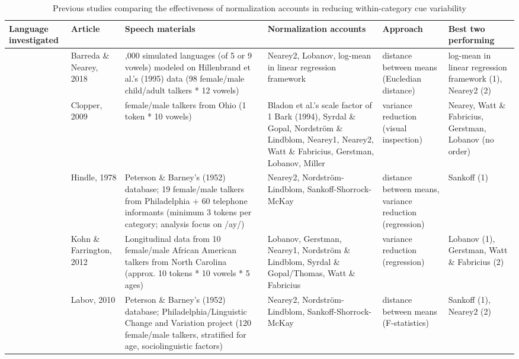\documentclass[utf8]{frontiersSCNS}
\begin{document}
\begin{landscape}\begin{table}

\caption{\label{tab:norm-evaluation-variability}Previous studies comparing the effectiveness of normalization accounts in reducing within-category cue variability}
\centering
\fontsize{7}{9}\selectfont
\begin{tabular}[t]{>{\raggedright\arraybackslash}p{2cm}>{\raggedright\arraybackslash}p{2cm}>{\raggedright\arraybackslash}p{5.5cm}>{\raggedright\arraybackslash}p{6cm}>{\raggedright\arraybackslash}p{2.5cm}>{\raggedright\arraybackslash}p{2.5cm}}
\toprule
Language investigated & Article & Speech materials & Normalization accounts & Approach & Best two performing\\
\midrule
 & Barreda \& Nearey, 2018 & 120,000 simulated languages (of 5 or 9 vowels) modeled on Hillenbrand et al.'s (1995) data (98 female/male child/adult talkers * 12 vowels) & Nearey2, Lobanov, log-mean in linear regression framework & distance between means (Eucledian distance) & log-mean in linear regression framework (1), Nearey2 (2)\\
\cmidrule{2-6}
 & Clopper, 2009 & 2 female/male talkers from Ohio (1 token * 10 vowels) & Bladon et al.'s scale factor of 1 Bark (1994), Syrdal \& Gopal, Nordström \& Lindblom, Nearey1, Nearey2, Watt \& Fabricius, Gerstman, Lobanov, Miller & variance reduction (visual inspection) & Nearey, Watt \& Fabricius, Gerstman, Lobanov (no order)\\
\cmidrule{2-6}
 & Hindle, 1978 & Peterson \& Barney's (1952) database; 19 female/male talkers from Philadelphia + 60 telephone informants (minimum 3 tokens per category; analysis focus on /ay/) & Nearey2, Nordström-Lindblom, Sankoff-Shorrock-McKay & distance between means, variance reduction (regression) & Sankoff (1)\\
\cmidrule{2-6}
 & Kohn \& Farrington, 2012 & Longitudinal data from 10 female/male African American talkers from North Carolina (approx. 10 tokens * 10 vowels * 5 ages) & Lobanov, Gerstman, Nearey1, Nordström \& Lindblom, Syrdal \& Gopal/Thomas, Watt \& Fabricius & variance reduction (regression) & Lobanov (1), Gerstman, Watt \& Fabricius (2)\\
\cmidrule{2-6}
\multirow{-5}{2cm}{\raggedright\arraybackslash US English} & Labov, 2010 & Peterson \& Barney's (1952) database; Philadelphia/Linguistic Change and Variation project (120 female/male talkers, stratified for age, sociolinguistic factors) & Nearey2, Nordström-Lindblom, Sankoff-Shorrock-McKay & distance between means (F-statistics) & Sankoff (1), Nearey2 (2)\\

\end{tabular}
\end{table}
\end{landscape}
\end{document}
